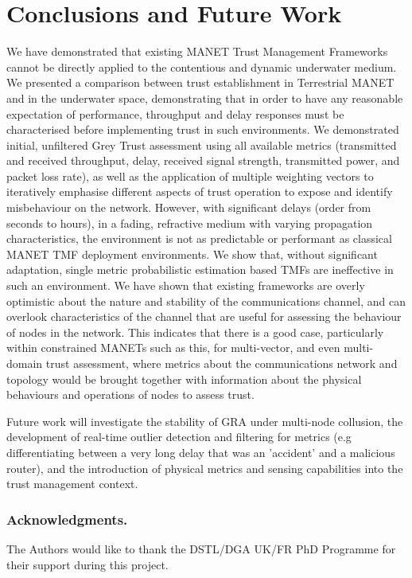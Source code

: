 \documentclass[runningheads,a4paper]{llncs}
\begin{document}
\section{Conclusions and Future Work}
We have demonstrated that existing MANET Trust Management Frameworks cannot be directly applied to the contentious and dynamic underwater medium.
We presented a comparison between trust establishment in Terrestrial MANET and in the underwater space, demonstrating that in order to have any reasonable expectation of performance, throughput and delay responses must be characterised before implementing trust in such environments. 
We demonstrated initial, unfiltered Grey Trust assessment using all available metrics (transmitted and received throughput, delay, received signal strength, transmitted power, and packet loss rate), as well as the application of multiple weighting vectors to iteratively emphasise different aspects of trust operation to expose and identify misbehaviour on the network.
However, with significant delays (order from seconds to hours), in a fading, refractive medium with varying propagation characteristics, the environment is not as predictable or performant as classical MANET TMF deployment environments.
We show that, without significant adaptation, single metric probabilistic estimation based TMFs are ineffective in such an environment.
We have shown that existing frameworks are overly optimistic about the nature and stability of the communications channel, and can overlook characteristics of the channel that are useful for assessing the behaviour of nodes in the network. 
This indicates that there is a good case, particularly within constrained MANETs such as this, for multi-vector, and even multi-domain trust assessment, where metrics about the communications network and topology would be brought together with information about the physical behaviours and operations of nodes to assess trust.

Future work will investigate the stability of GRA under multi-node collusion, the development of real-time outlier detection and filtering for metrics (e.g differentiating between a very long delay that was an 'accident' and a malicious router), and the introduction of physical metrics and sensing capabilities into the trust management context.

\subsubsection*{Acknowledgments.} The Authors would like to thank the DSTL/DGA UK/FR PhD Programme for their support during this project.
\end{document}
